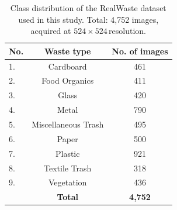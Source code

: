 \documentclass[a4paper,fleqn]{cas-dc}
\begin{document}
\begin{table}[t]
\small
\rmfamily
\caption{Class distribution of the RealWaste dataset used in this study.
Total: 4{,}752 images, acquired at $524\times524$\,resolution.}
\label{tbl:dataset}
\begin{tabular*}{\tblwidth}{@{\extracolsep{\fill}} lcc @{}}
\toprule
No. & Waste type & No. of images\\
\midrule
1.  & Cardboard          & 461\\
2.  & Food Organics      & 411\\
3.  & Glass              & 420\\
4.  & Metal              & 790\\
5.  & Miscellaneous Trash & 495\\
6.  & Paper              & 500\\
7.  & Plastic            & 921\\
8.  & Textile Trash      & 318\\
9.  & Vegetation         & 436\\
\midrule
& \textbf{Total}       & \textbf{4{,}752}\\
\bottomrule
\end{tabular*}
\end{table}
\end{document}
